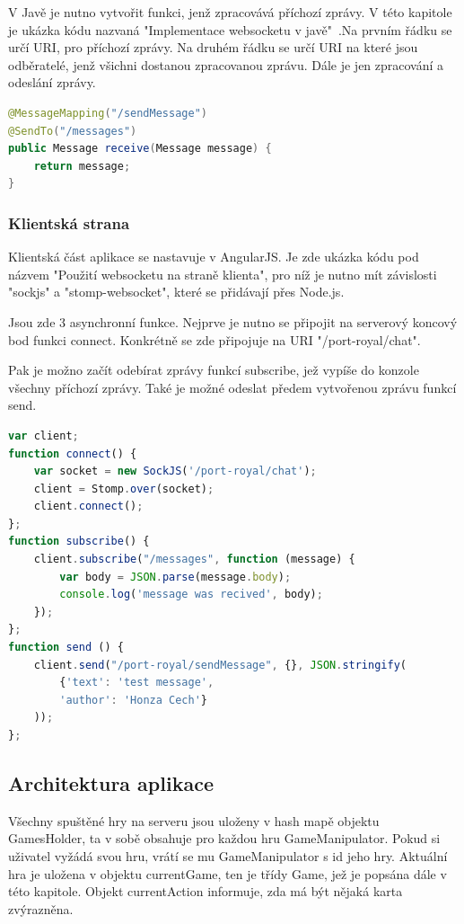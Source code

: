 \documentclass[czech,master,public,dept460,male,cpdeclaration,twoside]{diploma}
\begin{document}
V Javě je nutno vytvořit funkci, jenž zpracovává příchozí zprávy. V této kapitole je ukázka kódu nazvaná "Implementace websocketu v javě"~.Na prvním řádku se určí URI, pro příchozí zprávy. Na druhém řádku se určí URI na které jsou odběratelé, jenž všichni dostanou zpracovanou zprávu. Dále je jen zpracování a odeslání zprávy.\\

\begin{lstlisting}[language=Java, caption=Implementace websocketu v javě]
@MessageMapping("/sendMessage")
@SendTo("/messages")
public Message receive(Message message) {
    return message;
}
\end{lstlisting}

\subsubsection{Klientská strana}
Klientská část aplikace se nastavuje v AngularJS. Je zde ukázka kódu pod názvem "Použití websocketu na straně klienta", pro níž je nutno mít závislosti "sockjs" a "stomp-websocket", které se přidávají přes Node.js.

Jsou zde 3 asynchronní funkce. Nejprve je nutno se připojit na serverový koncový bod funkci connect. Konkrétně se zde připojuje na URI "/port-royal/chat". 

Pak je možno začít odebírat zprávy funkcí subscribe, jež vypíše do konzole všechny příchozí zprávy. Také je možné odeslat předem vytvořenou zprávu funkcí send.
\\
\begin{lstlisting}[language=JavaScript, caption=Použití websocketu na straně klienta]
var client;      
function connect() {
    var socket = new SockJS('/port-royal/chat');
    client = Stomp.over(socket);
    client.connect();
};
function subscribe() {
    client.subscribe("/messages", function (message) {
        var body = JSON.parse(message.body);
        console.log('message was recived', body);
    });
};
function send () {
    client.send("/port-royal/sendMessage", {}, JSON.stringify(
        {'text': 'test message',
        'author': 'Honza Cech'}
    ));
};
\end{lstlisting}

\subsection{Architektura aplikace}
Všechny spuštěné hry na serveru jsou uloženy v hash mapě objektu GamesHolder, ta v sobě obsahuje pro každou hru GameManipulator. Pokud si uživatel vyžádá svou hru, vrátí se mu GameManipulator s id jeho hry. Aktuální hra je uložena v objektu currentGame, ten je třídy Game, jež je popsána dále v této kapitole. Objekt currentAction informuje, zda má být nějaká karta zvýrazněna.
\end{document}

